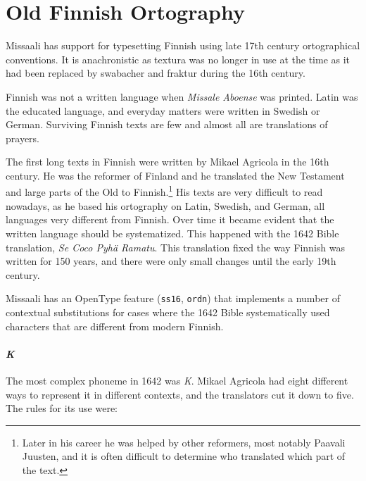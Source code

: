 \documentclass[a4paper, 12pt]{article}
\newcommand{\feature}[1]{\texttt{#1}}
\begin{document}
\label{pg:ligatures_end}



\section{Old Finnish Ortography}

Missaali has support for typesetting Finnish using late 17th century
ortographical conventions. It is anachronistic as textura was no
longer in use at the time as it had been replaced by swabacher and
fraktur during the 16th century.

Finnish was not a written language when \emph{Missale Aboense} was
printed. Latin was the educated language, and everyday matters were
written in Swedish or German. Surviving Finnish texts are few and
almost all are translations of prayers. 

The first long texts in Finnish were written by Mikael Agricola in the
16th century. He was the reformer of Finland and he translated the New
Testament and large parts of the Old to Finnish.\footnote{Later in his
  career he was helped by other reformers, most notably Paavali
  Juusten, and it is often difficult to determine who translated which
  part of the text.} His texts are very difficult to read nowadays, as
he based his ortography on Latin, Swedish, and German, all languages
very different from Finnish. Over time it became evident that the
written language should be systematized. This happened with the 1642
Bible translation, \emph{Se Coco Pyhä Ramatu}. This translation fixed
the way Finnish was written for 150 years, and there were only small
changes until the early 19th century.

Missaali has an OpenType feature (\feature{ss16}, \feature{ordn}) that
implements a number of contextual substitutions for cases where the
1642 Bible systematically used characters that are different from
modern Finnish.

\paragraph{\emph{K}} 

The most complex phoneme in 1642 was \emph{K}. Mikael Agricola had
eight different ways to represent it in different contexts, and the
translators cut it down to five. The rules for its use were:
\end{document}
